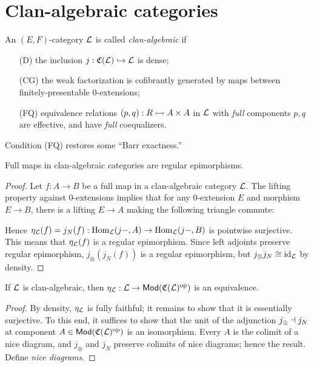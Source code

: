 \documentclass[a4paper]{article}
\begin{document}
\section{Clan-algebraic categories}

\begin{definition}
  An $(E,F)$-category $\mathcal{L}$ is called \emph{clan-algebraic} if
  \begin{enumerate}
  \item[(D)] the inclusion $j : \mathfrak{C}(\mathcal{L}) \hookrightarrow \mathcal{L}$ is dense;
  \item[(CG)] the weak factorization is cofibrantly generated by maps between finitely-presentable $0$-extensions;
  \item[(FQ)] equivalence relations $(p,q) : R \rightarrowtail A \times A$ in $\mathcal{L}$ with \emph{full} components $p, q$ are effective, and have \emph{full} coequalizers.
  \end{enumerate}
\end{definition}

\begin{remark}
  Condition (FQ) restores some ``Barr exactness.''
\end{remark}

\begin{lemma}
  Full maps in clan-algebraic categories are regular epimorphisms.
\end{lemma}
\begin{proof}
  Let $f : A \to B$ be a full map in a clan-algebraic category $\mathcal{L}$.
  The lifting property against 0-extensions implies that for any $0$-extension $E$ and morphism $E \to B$, there is a lifting $E \to A$ making the following triangle commute:
  \begin{center}
  \end{center}
  Hence $\eta_{\mathcal{L}}(f) = j_{N}(f) : \operatorname{\mathrm{Hom}_{\mathcal{L}}}(j-,A) \to \operatorname{\mathrm{Hom}_{\mathcal{L}}}(j-,B)$ is pointwise surjective.
  This means that $\eta_{\mathcal{L}}(f)$ is a regular epimorphism.
  Since left adjoints preserve regular epimorphism, $j_{\otimes}(j_N(f))$ is a regular epimorphism, but $j_{\otimes}j_N \cong \mathrm{id}_{\mathcal{L}}$ by density.
\end{proof}

\begin{theorem}
  If $\mathcal{L}$ is clan-algebraic, then $\eta_{\mathcal{L}} : \mathcal{L} \to \mathsf{Mod}(\mathfrak{C}(\mathcal{L})^{\mathrm{op}})$ is an equivalence.
\end{theorem}
\begin{proof}
  By density, $\eta_{\mathcal{L}}$ is fully faithful; it remains to show that it is essentially surjective.
  To this end, it suffices to show that the unit of the adjunction $j_{\otimes} \dashv j_{N}$ at component $A \in \mathsf{Mod}(\mathfrak{C}(\mathcal{L})^{\mathrm{op}})$ is an isomorphism.
  Every $A$ is the colimit of a nice diagram, and $j_{\otimes}$ and $j_N$ preserve colimits of nice diagrams; hence the result.
  \todo Define \emph{nice diagrams}.
\end{proof}

\printbibliography
\end{document}
